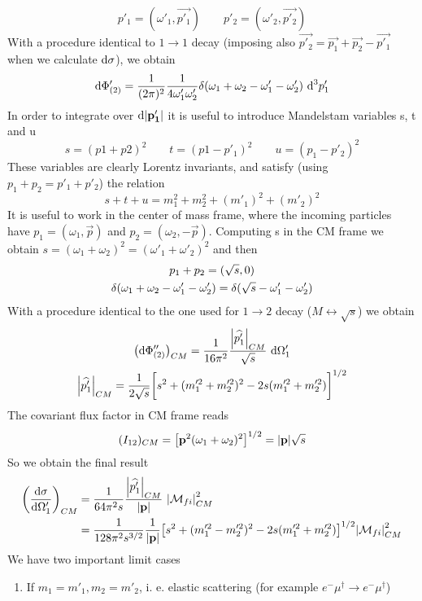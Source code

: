 \documentclass[TheoreticalPhy_ModB.tex]{subfiles}
\begin{document}
\begin{example}[$2 \to 2$ scattering]
\[p'_1 = (\omega'_1, \vec{p'_1}) \qquad
p'_2 = (\omega'_2, \vec{p'_2})
\]
With a procedure identical to $1 \to 1$ decay (imposing also $\vec{p'_2} = \vec{p_1} + \vec{p_2} - \vec{p'_1}$ when we calculate $\textup{d} \sigma$), we obtain 
\[
\textup{d} \Phi'_{(2)} = \frac{1}{(2 \pi)^2} \frac{1}{4 \omega'_1 \omega'_2} \delta (\omega_1 + \omega_2 - \omega'_1 - \omega'_2) \ \textup{d}^3p'_1
\]
In order to integrate over $\textup{d} \abs{\mathbf{p'_1}}$ it is useful to introduce Mandelstam variables s, t and u
\[
s = (p1 + p2)^2 \qquad
t = (p1 - p'_1)^2 \qquad
u = (p_1 - p'_2)^2
\]
These variables are clearly Lorentz invariants, and satisfy (using $p_1 + p_2 = p'_1 + p'_2$) the relation
\[
s + t + u = m_1^2 + m_2^2 + (m'_1)^2 + (m'_2)^2
\]
It is useful to work in the center of mass frame, where the incoming particles have $p_1 = (\omega_1, \vec{p})$ and $p_2 = (\omega_2, -\vec{p})$. Computing s in the CM frame we obtain $s = (\omega_1 + \omega_2)^2 = (\omega'_1 + \omega'_2)^2$ and then
\begin{gather}
p_1 + p_2 = (\sqrt{s}, 0) \notag \\
\delta(\omega_1 + \omega_2 - \omega'_1 -\omega'_2) = \delta (\sqrt{s} - \omega'_1 - \omega'_2) \notag
\end{gather}
With a procedure identical to the one used for $1 \to 2$ decay ($M \leftrightarrow \sqrt{s}$) we obtain
\begin{gather}
\bigl( \textup{d} \Phi''_{(2)} \bigr)_{CM} = \frac{1}{16 \pi^2} \frac{\abs{\widehat{p'_1}}_{CM}}{\sqrt{s}} \ \textup{d} \Omega'_1 \notag \\
\abs{\widehat{p'_1}}_{CM} = \frac{1}{2 \sqrt{s}} \biggl[ s^2 + (m^{\prime 2}_1 + m^{\prime 2}_2)^2 - 2s (m^{\prime 2}_1 + m^{\prime 2}_2) \biggr]^{1/2} \notag
\end{gather}
The covariant flux factor in CM frame reads
\[
(I_{12})_{CM} = \bigl[ \mathbf{p}^2 (\omega_1 + \omega_2 )^2 \bigr]^{1/2} = \abs{\mathbf{p}} \sqrt{s}
\]
So we obtain the final result
\[
\begin{split}
\biggl( \frac{\de \sigma}{\de \Omega'_1} \biggr)_{CM} 	
	& = \frac{1}{64 \pi^2 s} \frac{\abs{\widehat{p'_1}}_{CM}}{\abs{\vec{p}}} \ \abs{\mathM_{fi}}^2_{CM} \\
	& = \frac{1}{128 \pi^2 s^{3/2}} \frac{1}{\abs{\vec{p}}}
		\bigl[s^2 + (m_1^{\prime 2} - m_2^{\prime 2})^2 - 2s(m_1^{\prime 2} + m_2^{\prime 2}) \bigr]^{1/2}
		\abs{\mathM_{fi}}^2_{CM}
\end{split}
\]
We have two important limit cases
\begin{enumerate}[label=(\Alph*)]
\item If $m_1 = m'_1, m_2 = m'_2$, i. e. elastic scattering (for example $e^- \mu^{\dagger} \to e^-\mu^{\dagger}$)

\end{enumerate}
\end{example}
\end{document}
